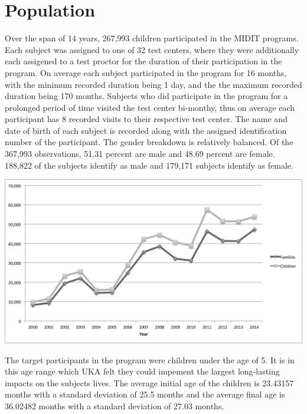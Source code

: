 \documentclass{article}
\begin{document}
\section{Population}
Over the span of 14 years, 267,993 children participated in the MIDIT programs. Each subject was assigned to one of 32 test centers, where they were additionally each assigened to a test proctor for the duration of their participation in the program. On average each subject participated in the program for 16 months, with the minimum recorded duration being 1 day, and the the maximum recorded duration being 170 months. Subjects who did participate in the program for a prolonged period of time visited the test center bi-monthy, thus on average each participant has 8 recorded visits to their respective test center. The name and date of birth of each subject is recorded along with the assigned identification number of the participant. The gender breakdown is relatively balanced. Of the 367,993 observations, 51.31 percent are male and 48.69 percent are female. 188,822 of the subjects identify as male and 179,171 subjects identify as female. 
\begin{center}
\includegraphics[scale=.5]{OverviewAux/children.png}
\end{center}
The target participants in the program were children under the age of 5. It is in this age range which UKA felt they could impement the largest long-lasting impacts on the subjects lives. The average initial age of the children is 23.43157 months with a standard deviation of 25.5 months and the average final age is 36.02482 months with a standard deviation of 27.03 months.  
\end{document}
